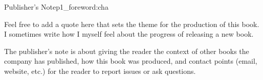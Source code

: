 

\begin{chapterpage}{Publisher's Note}{p1_foreword:cha}

\begin{myquotation}
Feel free to add a quote here that sets the theme for the production of this book. I sometimes write how I myself feel about the progress of releasing a new book.\end{myquotation}

\end{chapterpage}

The publisher's note is about giving the reader the context of other books the company has published, how this book was produced, and contact points (email, website, etc.) for the reader to report issues or ask questions.

\hfil{}\hfil
